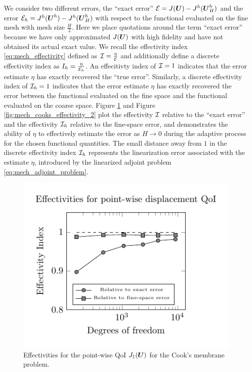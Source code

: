 We consider two different errors, the ``exact error'' $\mathcal{E} = J(\boldsymbol{U}) -
J^h(\boldsymbol{U}^h_H)$ and the error $\mathcal{E}_h = J^h(\boldsymbol{U}^h) - J^h(\boldsymbol{U}^h_H)$
with respect to the functional evaluated on the fine mesh with mesh size
$\frac{H}{2}$. Here we place quotations around the term ``exact error''
because we have only approximated $J(\boldsymbol{U})$ with high fidelity and have
not obtained its actual exact value. We recall the effectivity index
\eqref{eq:mech_effectivity} defined as $\mathcal{I} = \frac{\eta}{\mathcal{E}}$ and additionally
define a discrete effectivity index as $I_h = \frac{\eta}{\mathcal{E}_h}$. An
effecitivty index of $\mathcal{I} = 1$ indicates that the error estimate $\eta$ has
exactly recovered the ``true error''. Similarly, a discrete effectivity index
of $\mathcal{I}_h = 1$ indicates that the error estimate $\eta$ has exactly recovered
the error between the functional evaluated on the fine space and the
functional evaluated on the coarse space. Figure
\ref{fig:mech_cooks_effectivity_1} and Figure
\ref{fig:mech_cooks_effectivity_2}
plot the effectivity $\mathcal{I}$ relative to the
``exact error'' and the effectivity $\mathcal{I}_h$ relative to the fine-space error,
and demonstrates the ability of $\eta$ to effectively estimate the error as
$H \to 0$ during the adaptive process for the chosen functional quantities.
The small distance away from $1$ in the discrete effectivity index $\mathcal{I}_h$
represents the linearization error associated with the estimate $\eta$,
introduced by the linearized adjoint problem \eqref{eq:mech_adjoint_problem}.

\begin{figure}[ht!]
\centering
\includegraphics[width=.75\linewidth]{img/mech_cooks_pw_effectivity_plot.pdf}
\caption{Effectivities for the point-wise QoI $J_1(\boldsymbol{U})$
for the Cook's membrane problem.}
\label{fig:mech_cooks_effectivity_1}
\end{figure}

